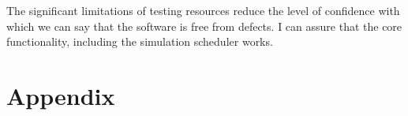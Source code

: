 \documentclass[11pt]{article}
\begin{document}
The significant limitations of testing resources reduce the level of confidence with which we can say that the software is free from defects. I can assure that the core functionality, including the simulation scheduler works.



\newpage
\raggedright
{}

\newpage
\section{Appendix}

\end{document}
